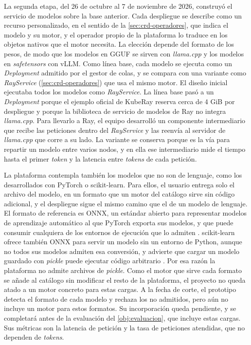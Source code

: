 La segunda etapa, del 26 de octubre al 7 de noviembre de 2026, construyó el servicio de modelos sobre la base anterior. Cada despliegue se describe como un recurso personalizado, en el sentido de la \cref{sec:crd-operadores}, que indica el modelo y su motor, y el operador propio de la plataforma lo traduce en los objetos nativos que el motor necesita. La elección depende del formato de los pesos, de modo que los modelos en GGUF se sirven con \emph{llama.cpp} y los modelos en \emph{safetensors} con vLLM. Como línea base, cada modelo se ejecuta como un \emph{Deployment} admitido por el gestor de colas, y se compara con una variante como \emph{RayService} (\cref{sec:crd-operadores}) que usa el mismo motor. El diseño inicial ejecutaba todos los modelos como \emph{RayService}. La línea base pasó a un \emph{Deployment} porque el ejemplo oficial de KubeRay reserva cerca de 4 GiB por despliegue y porque la biblioteca de servicio de modelos de Ray no integra \emph{llama.cpp}. Para llevarlo a Ray, el equipo desarrolló un componente intermediario que recibe las peticiones dentro del \emph{RayService} y las reenvía al servidor de \emph{llama.cpp} que corre a su lado. La variante se conserva porque es la vía para repartir un modelo entre varios nodos, y en ella ese intermediario mide el tiempo hasta el primer \emph{token} y la latencia entre \emph{tokens} de cada petición.

La plataforma contempla también los modelos que no son de lenguaje, como los desarrollados con PyTorch o scikit-learn. Para ellos, el usuario entrega solo el archivo del modelo, en un formato que un motor del catálogo sirve sin código adicional, y el despliegue sigue el mismo camino que el de un modelo de lenguaje. El formato de referencia es ONNX, un estándar abierto para representar modelos de aprendizaje automático al que PyTorch exporta sus modelos, y que puede consumir cualquiera de los entornos de ejecución que lo admiten \citep{pytorch-onnx-2026}. scikit-learn ofrece también ONNX para servir un modelo sin un entorno de Python, aunque no todos sus modelos admiten esa conversión, y advierte que cargar un modelo guardado con \emph{pickle} puede ejecutar código arbitrario \citep{sklearn-modelpersistence-2026}. Por esa razón la plataforma no admite archivos de \emph{pickle}. Como el motor que sirve cada formato se añade al catálogo sin modificar el resto de la plataforma, el proyecto no queda atado a un motor concreto para estas cargas. A la fecha de corte, el prototipo detecta el formato de cada modelo y rechaza los no admitidos, pero aún no incluye un motor para estos formatos. Su incorporación queda pendiente, y se completará antes de la evaluación del \cref{obj:evaluacion}, que incluye estas cargas. Sus métricas son la latencia de petición y la tasa de peticiones atendidas, que no dependen de \emph{tokens}.

